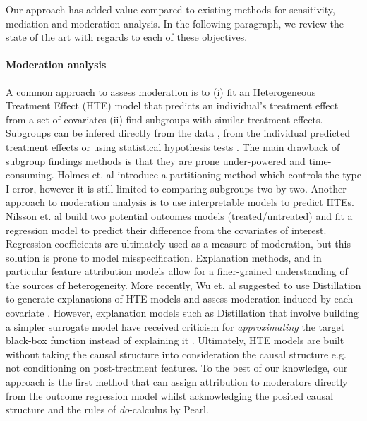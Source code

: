 \documentclass{article}
\theoremstyle{plain}
\theoremstyle{definition}
\theoremstyle{remark}
\theoremstyle{mystyle}
\begin{document}
Our approach has added value compared to existing methods for sensitivity, mediation and moderation analysis. In the following paragraph, we review the state of the art with regards to each of these objectives. \\

\paragraph{Moderation analysis} A common approach to assess moderation is to (i) fit an Heterogeneous Treatment Effect (HTE) model that predicts an individual's treatment effect from a set of covariates (ii) find subgroups with similar treatment effects. Subgroups can be infered directly from the data , from the individual predicted treatment effects  or using statistical hypothesis tests . The main drawback of subgroup findings methods is that they are prone under-powered and time-consuming. Holmes et. al  introduce a partitioning method which controls the type I error, however it is still limited to comparing subgroups two by two. Another approach to moderation analysis is to use interpretable models to predict HTEs. Nilsson et. al  build two potential outcomes models (treated/untreated) and fit a regression model to predict their difference from the covariates of interest. Regression coefficients are ultimately used as a measure of moderation, but this solution is prone to model misspecification. Explanation methods, and in particular feature attribution models allow for a finer-grained understanding of the sources of heterogeneity. More recently, Wu et. al suggested to use Distillation to generate explanations of HTE models and assess moderation induced by each covariate . However, explanation models such as Distillation that involve building a simpler surrogate model have received criticism for \textit{approximating} the target black-box function instead of explaining it . Ultimately, HTE models are built without taking the causal structure into consideration the causal structure e.g. not conditioning on post-treatment features. To the best of our knowledge, our approach is the first method that can assign attribution to moderators directly from the outcome regression model whilst acknowledging the posited causal structure and the rules of \textit{do}-calculus by Pearl. 
\end{document}
